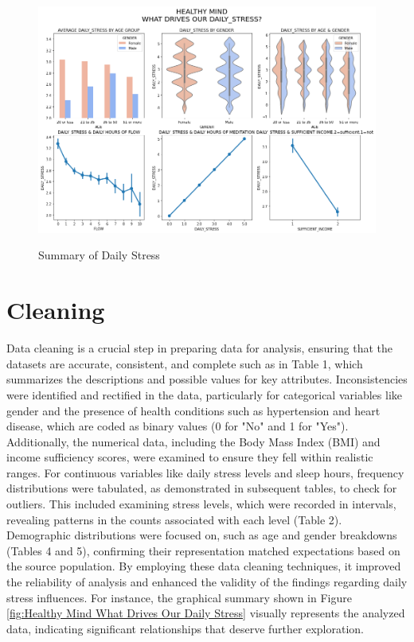 \documentclass[runningheads]{llncs}
\begin{document}
\begin{enumerate}
\begin{figure}
    \centering
    \includegraphics[width=1.2\linewidth]{__results___16_0.png}
    \caption{Summary of Daily Stress}\cite{Work-Life}
    \label{fig:enter-label}
\end{figure}

\section{Cleaning}
Data cleaning is a crucial step in preparing data for analysis, ensuring that the datasets are accurate, consistent, and complete such as in Table 1, which summarizes the descriptions and possible values for key attributes. Inconsistencies were identified and rectified in the data, particularly for categorical variables like gender and the presence of health conditions such as hypertension and heart disease, which are coded as binary values (0 for "No" and 1 for "Yes"). Additionally, the numerical data, including the Body Mass Index (BMI) and income sufficiency scores, were examined to ensure they fell within realistic ranges. For continuous variables like daily stress levels and sleep hours, frequency distributions were tabulated, as demonstrated in subsequent tables, to check for outliers. This included examining stress levels, which were recorded in intervals, revealing patterns in the counts associated with each level (Table 2). Demographic distributions were focused on, such as age and gender breakdowns (Tables 4 and 5), confirming their representation matched expectations based on the source population. By employing these data cleaning techniques, it improved the reliability of analysis and enhanced the validity of the findings regarding daily stress influences. For instance, the graphical summary shown in Figure \ref{fig:Healthy Mind What Drives Our Daily Stress} visually represents the analyzed data, indicating significant relationships that deserve further exploration.


\end{enumerate}
\end{document}
